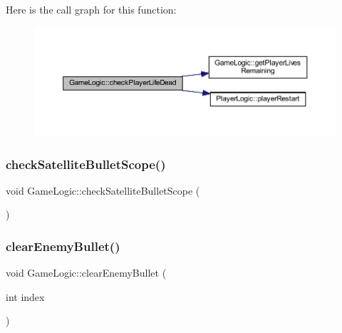 Here is the call graph for this function\+:
\nopagebreak
\begin{figure}[H]
\begin{center}
\leavevmode
\includegraphics[width=350pt]{class_game_logic_a612e0df42ffe7ab590ce5a87c94aa6c9_cgraph}
\end{center}
\end{figure}
\mbox{\label{class_game_logic_a196e25b5a240f8383ce8eab971938fc6}} 
\subsubsection{\texorpdfstring{check\+Satellite\+Bullet\+Scope()}{checkSatelliteBulletScope()}}
{\footnotesize\ttfamily void Game\+Logic\+::check\+Satellite\+Bullet\+Scope (\begin{DoxyParamCaption}{ }\end{DoxyParamCaption})}

\mbox{\label{class_game_logic_aa8b94076dcd3ad6419c50d0036af97d6}} 
\subsubsection{\texorpdfstring{clear\+Enemy\+Bullet()}{clearEnemyBullet()}}
{\footnotesize\ttfamily void Game\+Logic\+::clear\+Enemy\+Bullet (\begin{DoxyParamCaption}\item[{int}]{index }\end{DoxyParamCaption})}

\mbox{\label{class_game_logic_ad9b8589c1559ac09ae5674c5c87be600}} 
